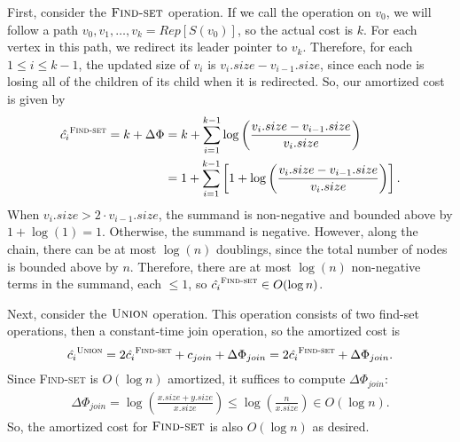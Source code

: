 First, consider the $\textsc{Find-set}$ operation. If we call the operation on $v_0$, we will follow a path $v_0, v_1, \hdots, v_k = Rep[S(v_0)]$, so the actual cost is $k$. For each vertex in this path, we redirect its leader pointer to $v_k$. Therefore, for each $1\leq i\leq k-1$, the updated size of $v_i$ is $v_i.size-v_{i-1}.size$, since each node is losing all of the children of its child when it is redirected. So, our amortized cost is given by
\begin{align*}
    \hat{c_i}^{\textsc{Find-set}} = k + \Delta \Phi &= k + \sum_{i=1}^{k-1}\log\left(\frac{v_{i}.size - v_{i-1}.size}{v_{i}.size}\right) \\
    &= 1 + \sum_{i=1}^{k-1}\left[1+\log\left(\frac{v_{i}.size - v_{i-1}.size}{v_{i}.size}\right)\right].
\end{align*}
When $v_{i}.size > 2\cdot v_{i-1}.size$, the summand is non-negative and bounded above by $1+\log(1) = 1$. Otherwise, the summand is negative. However, along the chain, there can be at most $\log(n)$ doublings, since the total number of nodes is bounded above by $n$. Therefore, there are at most $\log(n)$ non-negative terms in the summand, each $\leq 1$, so $\hat{c_i}^{\textsc{Find-set}}\in O(\log n)$.  

Next, consider the $\textsc{Union}$ operation. This operation consists of two find-set operations, then a constant-time join operation, so the amortized cost is
\[\hat{c_i}^{\textsc{Union}} = 2\hat{c_i}^{\textsc{Find-set}} + c_{join} + \Delta \Phi_{join} = 2\hat{c_i}^{\textsc{Find-set}} + \Delta\Phi_{join}.\]
Since \textsc{Find-set} is $O(\log n)$ amortized, it suffices to compute $\Delta\Phi_{join}$:
\begin{align*}
    \Delta\Phi_{join} = \log\left(\frac{x.size + y.size}{x.size}\right) \leq \log\left(\frac{n}{x.size}\right)\in O(\log n).
\end{align*}
So, the amortized cost for $\textsc{Find-set}$ is also $O(\log n)$ as desired. 
